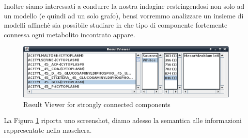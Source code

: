 Inoltre siamo interessati a condurre la nostra indagine restringendosi
non solo ad un modello (e quindi ad un solo grafo), bensi vorremmo
analizzare un insieme di modelli affinch\`e sia possibile studiare in
che tipo di componente fortemente connessa ogni metabolito incontrato
appare.

\begin{figure}
  \centering
  \includegraphics[scale=.5,
  angle=90]{images/ResultViewer-execution.eps}
  \caption{Result Viewer for strongly connected components}
  \label{fig:result-viewer-scc}
\end{figure}
La Figura \ref{fig:result-viewer-scc} riporta uno screenshot, diamo
adesso la semantica alle informazioni rappresentate nella maschera.


